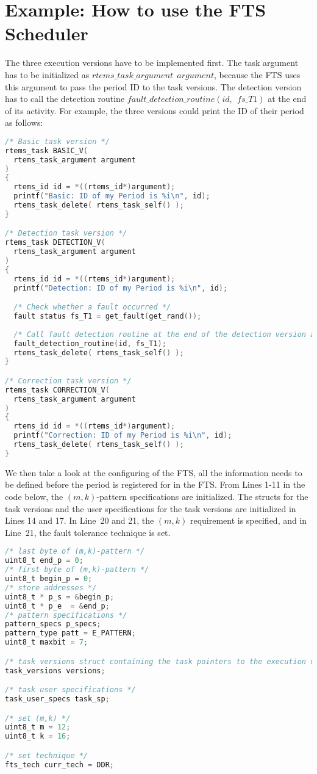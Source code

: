 \section{Example: How to use the FTS Scheduler}
The three execution versions have to be implemented first. The task argument has to be initialized as $rtems\_task\_argument~~argument$, because the FTS uses this argument to pass the period ID to the task versions. The detection version has to call the detection routine $fault\_detection\_routine(id,~~fs\_T1)$ at the end of its activity. For example, the three versions could print the ID of their period as follows:
\begin{lstlisting}[language=C]
/* Basic task version */
rtems_task BASIC_V(
  rtems_task_argument argument
)
{
  rtems_id id = *((rtems_id*)argument);
  printf("Basic: ID of my Period is %i\n", id);
  rtems_task_delete( rtems_task_self() );
}

/* Detection task version */
rtems_task DETECTION_V(
  rtems_task_argument argument
)
{
  rtems_id id = *((rtems_id*)argument);
  printf("Detection: ID of my Period is %i\n", id);

  /* Check whether a fault occurred */  
  fault status fs_T1 = get_fault(get_rand());
  
  /* Call fault detection routine at the end of the detection version activity */
  fault_detection_routine(id, fs_T1);
  rtems_task_delete( rtems_task_self() );
}

/* Correction task version */
rtems_task CORRECTION_V(
  rtems_task_argument argument
)
{
  rtems_id id = *((rtems_id*)argument);
  printf("Correction: ID of my Period is %i\n", id);
  rtems_task_delete( rtems_task_self() );
}

\end{lstlisting}
We then take a look at the configuring of the FTS, all the information needs to be defined before the period is registered for in the FTS. From Lines 1-11 in the code below, the $(m,k)$-pattern specifications are initialized. The structs for the task versions and the user specifications for the task versions are initialized in Lines 14 and 17. In Line~20 and 21, the $(m,k)$ requirement is specified, and in Line~21, the fault tolerance technique is set.
\begin{lstlisting}[language=C]
/* last byte of (m,k)-pattern */
uint8_t end_p = 0; 
/* first byte of (m,k)-pattern */
uint8_t begin_p = 0;
/* store addresses */
uint8_t * p_s = &begin_p;
uint8_t * p_e  = &end_p;
/* pattern specifications */
pattern_specs p_specs;
pattern_type patt = E_PATTERN;
uint8_t maxbit = 7;

/* task versions struct containing the task pointers to the execution versions */
task_versions versions;

/* task user specifications */
task_user_specs task_sp;

/* set (m,k) */
uint8_t m = 12;
uint8_t k = 16;

/* set technique */
fts_tech curr_tech = DDR;
\end{lstlisting}

